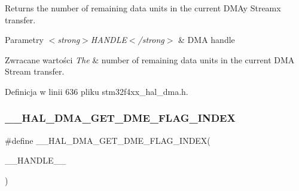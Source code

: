 Returns the number of remaining data units in the current D\+M\+Ay Streamx transfer. 


\begin{DoxyParams}{Parametry}
{\em $<$strong$>$\+H\+A\+N\+D\+L\+E$<$/strong$>$} & D\+MA handle\\
\hline
\end{DoxyParams}

\begin{DoxyRetVals}{Zwracane wartości}
{\em The} & number of remaining data units in the current D\+MA Stream transfer. \\
\hline
\end{DoxyRetVals}


Definicja w linii 636 pliku stm32f4xx\+\_\+hal\+\_\+dma.\+h.

\mbox{\label{group___d_m_a_ga23d1f282af3b9aa7aa396dcad94865d8}} 
\subsubsection{\texorpdfstring{\+\_\+\+\_\+\+H\+A\+L\+\_\+\+D\+M\+A\+\_\+\+G\+E\+T\+\_\+\+D\+M\+E\+\_\+\+F\+L\+A\+G\+\_\+\+I\+N\+D\+EX}{\_\_HAL\_DMA\_GET\_DME\_FLAG\_INDEX}}
{\footnotesize\ttfamily \#define \+\_\+\+\_\+\+H\+A\+L\+\_\+\+D\+M\+A\+\_\+\+G\+E\+T\+\_\+\+D\+M\+E\+\_\+\+F\+L\+A\+G\+\_\+\+I\+N\+D\+EX(\begin{DoxyParamCaption}\item[{}]{\+\_\+\+\_\+\+H\+A\+N\+D\+L\+E\+\_\+\+\_\+ }\end{DoxyParamCaption})}

